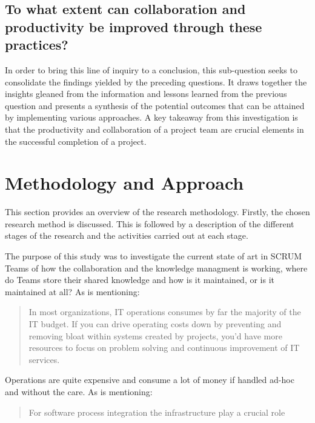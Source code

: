 \subsection{To what extent can collaboration and productivity be improved through these practices?}
In order to bring this line of inquiry to a conclusion, this sub-question seeks to consolidate the findings yielded by the preceding questions. It draws together the insights gleaned from the information and lessons learned from the previous question and presents a synthesis of the potential outcomes that can be attained by implementing various approaches.
A key takeaway from this investigation is that the productivity and collaboration of a project team are crucial elements in the successful completion of a project.


\section{Methodology and Approach}

This section provides an overview of the research methodology. Firstly, the chosen research method is discussed. This is followed by a description of the different stages of the research and the activities carried out at each stage.

The purpose of this study was to investigate the current state of art in SCRUM Teams of how the collaboration and the knowledge managment is working, where do Teams store their shared knowledge and how is it maintained, or is it maintained at all? As \cite{HumbleMolesky2011} is mentioning:

\begin{quote}
In most organizations, IT operations
consumes by far the majority of the IT budget. If you
can drive operating costs down by preventing and
removing bloat within systems created by projects,
you’d have more resources to focus on problem solving
and continuous improvement of IT services.
\end{quote}

Operations are quite expensive and consume a lot of money if handled ad-hoc and without the care. As \cite{Azad2023DevOps} is mentioning:

\begin{quote}
For software process integration the infrastructure play a crucial role
\end{quote}

